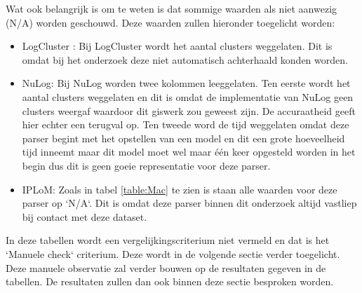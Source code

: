 Wat ook belangrijk is om te weten is dat sommige waarden als niet aanwezig (N/A) worden geschouwd. Deze waarden zullen hieronder toegelicht worden:
\begin{itemize}
    \item LogCluster : Bij LogCluster wordt het aantal clusters weggelaten. Dit is omdat bij het onderzoek deze niet automatisch achterhaald konden worden.\\
    
    \item NuLog: Bij NuLog worden twee kolommen leeggelaten. Ten eerste wordt het aantal clusters weggelaten en dit is omdat de implementatie van NuLog geen clusters weergaf waardoor dit giswerk zou geweest zijn. De accuraatheid geeft hier echter een terugval op. Ten tweede word de tijd weggelaten omdat deze parser begint met het opstellen van een model en dit een grote hoeveelheid tijd inneemt maar dit model moet wel maar één keer opgesteld worden in het begin dus dit is geen goeie representatie voor deze parser.
    
    \item IPLoM: Zoals in tabel \ref{table:Mac} te zien is staan alle waarden voor deze parser op `N/A`. Dit is omdat deze parser binnen dit onderzoek altijd vastliep bij contact met deze dataset.
\end{itemize}

In deze tabellen wordt een vergelijkingscriterium niet vermeld en dat is het `Manuele check` criterium. Deze wordt in de volgende sectie verder toegelicht. Deze manuele observatie zal verder bouwen op de resultaten gegeven in de tabellen. De resultaten zullen dan ook binnen deze sectie besproken worden.

